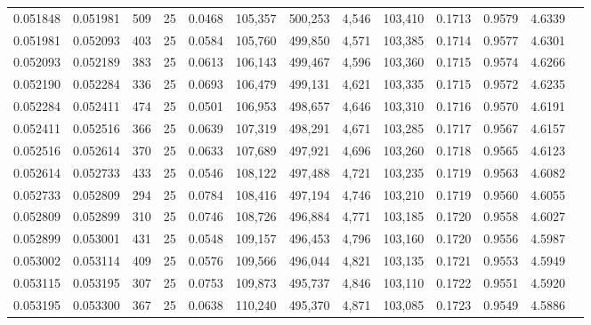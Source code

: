 \begin{tabular}{rrrrrrrrrrrrr}
0.051848 & 0.051981 &   509 &  25 &                                     0.0468 & 105,357 & 500,253 &   4,546 & 103,410 & 0.1713 & 0.9579 & 4.6339 \\
0.051981 & 0.052093 &   403 &  25 &                                     0.0584 & 105,760 & 499,850 &   4,571 & 103,385 & 0.1714 & 0.9577 & 4.6301 \\
0.052093 & 0.052189 &   383 &  25 &                                     0.0613 & 106,143 & 499,467 &   4,596 & 103,360 & 0.1715 & 0.9574 & 4.6266 \\
0.052190 & 0.052284 &   336 &  25 &                                     0.0693 & 106,479 & 499,131 &   4,621 & 103,335 & 0.1715 & 0.9572 & 4.6235 \\
0.052284 & 0.052411 &   474 &  25 &                                     0.0501 & 106,953 & 498,657 &   4,646 & 103,310 & 0.1716 & 0.9570 & 4.6191 \\
0.052411 & 0.052516 &   366 &  25 &                                     0.0639 & 107,319 & 498,291 &   4,671 & 103,285 & 0.1717 & 0.9567 & 4.6157 \\
0.052516 & 0.052614 &   370 &  25 &                                     0.0633 & 107,689 & 497,921 &   4,696 & 103,260 & 0.1718 & 0.9565 & 4.6123 \\
0.052614 & 0.052733 &   433 &  25 &                                     0.0546 & 108,122 & 497,488 &   4,721 & 103,235 & 0.1719 & 0.9563 & 4.6082 \\
0.052733 & 0.052809 &   294 &  25 &                                     0.0784 & 108,416 & 497,194 &   4,746 & 103,210 & 0.1719 & 0.9560 & 4.6055 \\
0.052809 & 0.052899 &   310 &  25 &                                     0.0746 & 108,726 & 496,884 &   4,771 & 103,185 & 0.1720 & 0.9558 & 4.6027 \\
0.052899 & 0.053001 &   431 &  25 &                                     0.0548 & 109,157 & 496,453 &   4,796 & 103,160 & 0.1720 & 0.9556 & 4.5987 \\
0.053002 & 0.053114 &   409 &  25 &                                     0.0576 & 109,566 & 496,044 &   4,821 & 103,135 & 0.1721 & 0.9553 & 4.5949 \\
0.053115 & 0.053195 &   307 &  25 &                                     0.0753 & 109,873 & 495,737 &   4,846 & 103,110 & 0.1722 & 0.9551 & 4.5920 \\
0.053195 & 0.053300 &   367 &  25 &                                     0.0638 & 110,240 & 495,370 &   4,871 & 103,085 & 0.1723 & 0.9549 & 4.5886 \\

\end{tabular}
